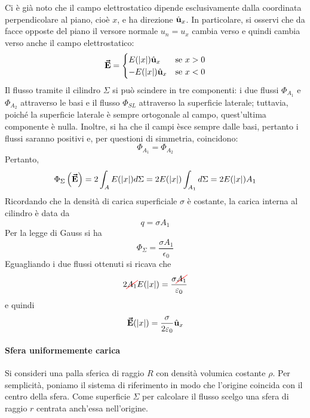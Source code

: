 Ci è già noto che il campo elettrostatico dipende esclusivamente dalla coordinata perpendicolare al piano, cioè $x$, e ha direzione $\hat{\mathbf{u}}_x$. In particolare, si osservi che da facce opposte del piano il versore normale $u_n=u_x$ cambia verso e quindi cambia verso anche il campo elettrostatico:
\begin{equation*}
	\vb*{\va{E}}=
	\begin{cases}
		E(\abs{x})\hat{\mathbf{u}}_x&\text{se}\ x>0\\
		-E(\abs{x})\hat{\mathbf{u}}_x&\text{se}\ x<0
	\end{cases}
\end{equation*}
Il flusso tramite il cilindro $\Sigma$ si può scindere in tre componenti: i due flussi $\Phi_{A_1}$ e $\Phi_{A_2}$ attraverso le basi e il flusso $\Phi_{SL}$ attraverso la superficie laterale; tuttavia, poiché la superficie laterale è sempre ortogonale al campo, quest'ultima componente è nulla. Inoltre, si ha che il campi èsce sempre dalle basi, pertanto i flussi saranno positivi e, per questioni di simmetria, coincidono:
\begin{equation}
	\Phi_{A_1}=\Phi_{A_2}
\end{equation}
Pertanto,
\begin{equation*}
	\Phi_{\Sigma}\left(\vb*{\va{E}}\right)=2\int_A E(\abs{x})d\Sigma=2 E(\abs{x})\int_{A_1}d\Sigma=2E(\abs{x})A_1
\end{equation*}
Ricordando che la densità di carica superficiale $\sigma$ è costante, la carica interna al cilindro è data da
\begin{equation*}
	q=\sigma A_1
\end{equation*}
Per la legge di Gauss si ha
\begin{equation*}
	\Phi_{\Sigma}=\frac{\sigma A_1}{\epsilon_0}
\end{equation*}
Eguagliando i due flussi ottenuti si ricava che
\begin{equation*}
	2\Ccancel[red]{A_1}E(\abs{x})=\frac{\sigma \Ccancel[red]{A_1}}{\epsilon_0}
\end{equation*}
e quindi
\begin{equation}
	\vb*{\va{E}}(\abs{x})=\frac{\sigma}{2\varepsilon_0}\hat{\mathbf{u}}_x
\end{equation}
\paragraph{Sfera uniformemente carica}
Si consideri una palla sferica di raggio $R$ con densità volumica costante $\rho$. Per semplicità, poniamo il sistema di riferimento in modo che l'origine coincida con il centro della sfera. Come superficie $\Sigma$ per calcolare il flusso scelgo una sfera di raggio $r$ centrata anch'essa nell'origine.

